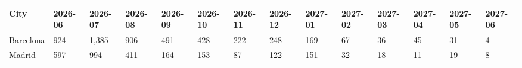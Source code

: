 \begin{tabular}{llllllllllllll}
\toprule
City & 2026-06 & 2026-07 & 2026-08 & 2026-09 & 2026-10 & 2026-11 & 2026-12 & 2027-01 & 2027-02 & 2027-03 & 2027-04 & 2027-05 & 2027-06 \\
\midrule
Barcelona & 924 & 1,385 & 906 & 491 & 428 & 222 & 248 & 169 & 67 & 36 & 45 & 31 & 4 \\
Madrid & 597 & 994 & 411 & 164 & 153 & 87 & 122 & 151 & 32 & 18 & 11 & 19 & 8 \\
\bottomrule
\end{tabular}
